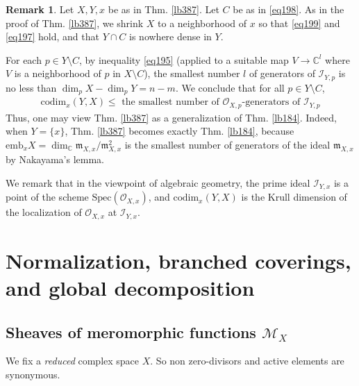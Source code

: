 \documentclass[12pt,b5paper,notitlepage]{report}
\theoremstyle{definition}
\newtheorem{rem}[df]{Remark}
\theoremstyle{plain}
\newcommand{\scr}{\mathscr}
\newcommand{\Cbb}{\mathbb C}
\newcommand{\emb}{\mathrm{emb}}
\newcommand{\mk}{\mathfrak m}
\newcommand{\codim}{\mathrm{codim}}
\numberwithin{equation}{section}
\begin{document}
\begin{rem}
Let $X,Y,x$ be as in Thm. \ref{lb387}. Let $C$ be as in \eqref{eq198}. As in the proof of Thm. \ref{lb387}, we shrink $X$ to a neighborhood of $x$ so that \eqref{eq199} and \eqref{eq197} hold, and that $Y\cap C$ is nowhere dense in $Y$.

For each $p\in Y\setminus C$, by inequality \eqref{eq195} (applied to a suitable map $V\rightarrow \Cbb^l$ where $V$ is a neighborhood of $p$ in $X\setminus C$), the smallest number $l$ of generators of $\scr I_{Y,p}$ is no less than  $\dim_p X-\dim_p Y=n-m$. We conclude that for all $p\in Y\setminus C$,
\begin{align}
\codim_x(Y,X)\leq\text{ the smallest number of $\scr O_{X,p}$-generators of }\scr I_{Y,p}
\end{align}
Thus, one may view Thm. \ref{lb387} as a generalization of Thm. \ref{lb184}. Indeed, when $Y=\{x\}$, Thm. \ref{lb387} becomes exactly Thm. \ref{lb184}, because $\emb_xX=\dim_\Cbb\mk_{X,x}/\mk_{X,x}^2$ is the smallest number of generators of the ideal $\mk_{X,x}$ by Nakayama's lemma. 

We remark that in the viewpoint of algebraic geometry, the prime ideal $\scr I_{Y,x}$ is a point of the scheme $\mathrm{Spec}(\scr O_{X,x})$, and $\codim_x(Y,X)$ is the Krull dimension of the localization of $\scr O_{X,x}$ at $\scr I_{Y,x}$.   \hfill\qedsymbol
\end{rem}















\chapter{Normalization, branched coverings, and global decomposition}



\section{Sheaves of meromorphic functions $\scr M_X$}



We fix a \textit{reduced} complex space $X$. So non zero-divisors and active elements are synonymous.
\end{document}
